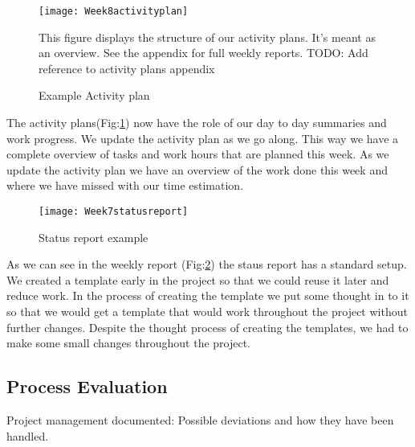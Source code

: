     \begin{figure}[h]
        \centering
        \texttt{[image: Week8activityplan]}
        \caption{Example Activity plan}
        This figure displays the structure of our activity plans. It's meant as an overview. See the appendix for full weekly reports. TODO: Add reference to activity plans appendix %
        \label{fig:Week8activityplan}
    \end{figure}
    
    The activity plans(Fig:\ref{fig:Week8activityplan}) now have the role of our day to day summaries and work progress. We update the activity plan as we go along. This way we have a complete overview of tasks and work hours that are planned this week. As we update the activity plan we have an overview of the work done this week and where we have missed with our time estimation. 
    
    \begin{figure}[h]
        \centering
        \texttt{[image: Week7statusreport]}
        \caption{Status report example}
        \label{fig:Week7statusreport}
    \end{figure}
    
    As we can see in the weekly report (Fig:\ref{fig:Week7statusreport}) the staus report has a standard setup. We created a template early in the project so that we could reuse it later and reduce work. In the process of creating the template we put some thought in to it so that we would get a template that would work throughout the project without further changes. Despite the thought process of creating the templates, we had to make some small changes throughout the project.
    
       \subsection{Process Evaluation}\label{Process Evaluation}
    
    Project management documented: 
    Possible deviations and how they have
been handled. 
